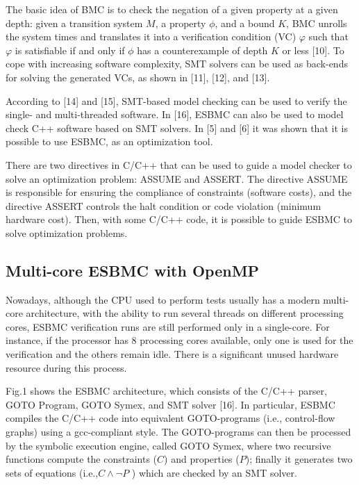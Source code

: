 The basic idea of BMC is to check the negation of a given property at a given depth: given a transition system $ M $, a property $ \phi $, and a bound $ K $, BMC unrolls the system  times and translates it into a verification condition (VC) $ \varphi $  such that $ \varphi $   is satisfiable if and only if $ \phi $ has a counterexample of depth $ K $ or less [10]. To cope with increasing software complexity, SMT solvers can be used as back-ends for solving the generated VCs, as shown in [11], [12], and [13]. 

According to [14] and [15], SMT-based model checking can be used to verify the single- and multi-threaded software. In [16], ESBMC can also be used to model check C++ software based on SMT solvers. In [5] and [6] it was shown that it is possible to use ESBMC, as an optimization tool.

There are two directives in C/C++ that can be used to guide a model checker to solve an optimization problem: ASSUME and ASSERT. The directive ASSUME is responsible for ensuring the compliance of constraints (software costs), and the directive ASSERT controls the halt condition or code violation (minimum hardware cost). Then, with some C/C++ code, it is possible to guide ESBMC to solve optimization problems.



\subsection{Multi-core ESBMC with OpenMP}
Nowadays, although the CPU used to perform tests usually has a modern multi-core architecture, with the ability to run several threads on different processing cores, ESBMC verification runs are still performed only in a single-core. For instance, if the processor has 8 processing cores available, only one is used for the verification and the others remain idle. There is a significant unused hardware resource during this process.

Fig.1 shows the ESBMC architecture, which consists of the C/C++ parser, GOTO Program, GOTO Symex, and SMT solver [16]. In particular, ESBMC compiles the C/C++ code into equivalent GOTO-programs (i.e., control-flow graphs) using a gcc-compliant style. The GOTO-programs can then be processed by the symbolic execution engine, called GOTO Symex, where two recursive functions compute the constraints ($ C $) and properties ($ P $); finally it generates two sets of equations (i.e.,\:$ C \land \neg P $ ) which are checked by an SMT solver. 

